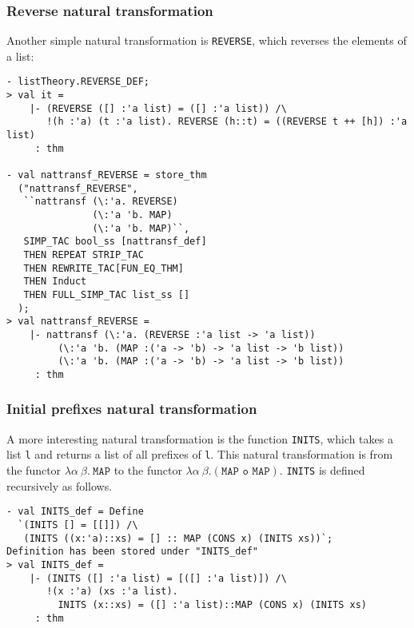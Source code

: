 \subsubsection{Reverse natural transformation}

Another simple natural transformation is
\texttt{REVERSE},
which reverses the elements of a list:

\begin{session}
\begin{verbatim}
- listTheory.REVERSE_DEF;
> val it =
    |- (REVERSE ([] :'a list) = ([] :'a list)) /\
       !(h :'a) (t :'a list). REVERSE (h::t) = ((REVERSE t ++ [h]) :'a list)
     : thm

- val nattransf_REVERSE = store_thm
  ("nattransf_REVERSE",
   ``nattransf (\:'a. REVERSE)
               (\:'a 'b. MAP)
               (\:'a 'b. MAP)``,
   SIMP_TAC bool_ss [nattransf_def]
   THEN REPEAT STRIP_TAC
   THEN REWRITE_TAC[FUN_EQ_THM]
   THEN Induct
   THEN FULL_SIMP_TAC list_ss []
  );
> val nattransf_REVERSE =
    |- nattransf (\:'a. (REVERSE :'a list -> 'a list))
         (\:'a 'b. (MAP :('a -> 'b) -> 'a list -> 'b list))
         (\:'a 'b. (MAP :('a -> 'b) -> 'a list -> 'b list))
     : thm
\end{verbatim}
\end{session}

\subsubsection{Initial prefixes natural transformation}

A more interesting natural transformation is the function \texttt{INITS},
which takes a list \texttt{l} and returns a list of all prefixes of \texttt{l}.
This natural transformation is from the functor $\lambda\alpha\ \beta.\ \texttt{MAP}$
to the functor $\lambda\alpha\ \beta.(\texttt{MAP~o~MAP})$.
\texttt{INITS} is defined recursively as follows.

\begin{session}
\begin{verbatim}
- val INITS_def = Define
  `(INITS [] = [[]]) /\
   (INITS ((x:'a)::xs) = [] :: MAP (CONS x) (INITS xs))`;
Definition has been stored under "INITS_def"
> val INITS_def =
    |- (INITS ([] :'a list) = [([] :'a list)]) /\
       !(x :'a) (xs :'a list).
         INITS (x::xs) = ([] :'a list)::MAP (CONS x) (INITS xs)
     : thm
\end{verbatim}
\end{session}

